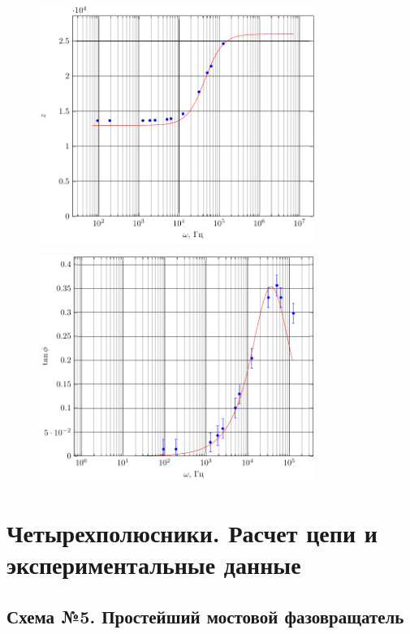
\begin{figure}[H]
	\centering
	\includegraphics[width=0.8\textwidth]{img/chem4_z}
	\label{fig:RRL_z}
\end{figure}
\begin{figure}[H]
	\centering
	\includegraphics[width=0.8\textwidth]{img/chem4_phi}
	\label{fig:RRL_tanphi}
\end{figure}


\section{Четырехполюсники. Расчет цепи и экспериментальные данные}

\subsection{Схема №5. Простейший мостовой фазовращатель}

